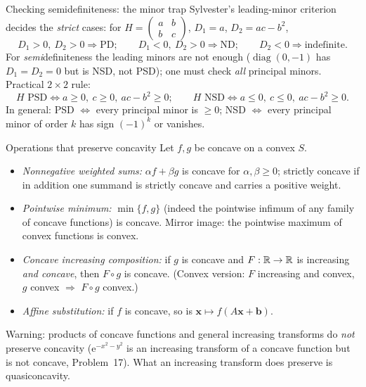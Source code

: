 \begin{rulebox}{Checking semidefiniteness: the minor trap}
Sylvester's leading-minor criterion decides the \emph{strict} cases: for
$H=\begin{pmatrix}a&b\\b&c\end{pmatrix}$, $D_1=a$, $D_2=ac-b^{2}$,
\[
  D_1>0,\ D_2>0 \Rightarrow \text{PD}; \qquad
  D_1<0,\ D_2>0 \Rightarrow \text{ND}; \qquad
  D_2<0 \Rightarrow \text{indefinite}.
\]
For \emph{semi}definiteness the leading minors are not enough
($\operatorname{diag}(0,-1)$ has $D_1=D_2=0$ but is NSD, not PSD); one must
check \emph{all} principal minors. Practical $2\times2$ rule:
\[
  H \text{ PSD} \iff a\ge0,\ c\ge0,\ ac-b^{2}\ge0;
  \qquad
  H \text{ NSD} \iff a\le0,\ c\le0,\ ac-b^{2}\ge0 .
\]
In general: PSD $\iff$ every principal minor is $\ge0$; NSD $\iff$ every
principal minor of order $k$ has sign $(-1)^{k}$ or vanishes.
\end{rulebox}

\begin{rulebox}{Operations that preserve concavity}
Let $f,g$ be concave on a convex $S$.
\begin{itemize}[leftmargin=1.6em,itemsep=0.3ex]
  \item \emph{Nonnegative weighted sums:} $\alpha f+\beta g$ is concave for
        $\alpha,\beta\ge0$; strictly concave if in addition one summand is
        strictly concave and carries a positive weight.
  \item \emph{Pointwise minimum:} $\min\{f,g\}$ (indeed the pointwise
        infimum of any family of concave functions) is concave. Mirror
        image: the pointwise maximum of convex functions is convex.
  \item \emph{Concave increasing composition:} if $g$ is concave and
        $F:\mathbb{R}\to\mathbb{R}$ is increasing \emph{and concave}, then $F\circ g$ is
        concave. (Convex version: $F$ increasing and convex, $g$ convex
        $\Rightarrow$ $F\circ g$ convex.)
  \item \emph{Affine substitution:} if $f$ is concave, so is
        $\mathbf{x}\mapsto f(A\mathbf{x}+\mathbf{b})$.
\end{itemize}
Warning: products of concave functions and general increasing transforms do
\emph{not} preserve concavity ($\mathrm{e}^{-x^{2}-y^{2}}$ is an increasing
transform of a concave function but is not concave, Problem~17). What an
increasing transform does preserve is quasiconcavity.
\end{rulebox}

